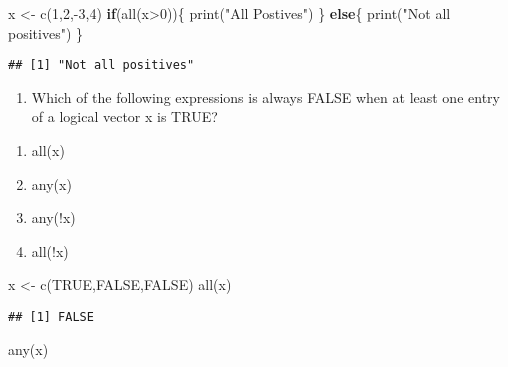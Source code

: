 \documentclass[
]{article}
\newenvironment{Shaded}{\begin{snugshade}}{\end{snugshade}}
\newcommand{\ConstantTok}[1]{\textcolor[rgb]{0.00,0.00,0.00}{#1}}
\newcommand{\ControlFlowTok}[1]{\textcolor[rgb]{0.13,0.29,0.53}{\textbf{#1}}}
\newcommand{\DecValTok}[1]{\textcolor[rgb]{0.00,0.00,0.81}{#1}}
\newcommand{\FunctionTok}[1]{\textcolor[rgb]{0.00,0.00,0.00}{#1}}
\newcommand{\NormalTok}[1]{#1}
\newcommand{\OtherTok}[1]{\textcolor[rgb]{0.56,0.35,0.01}{#1}}
\newcommand{\SpecialCharTok}[1]{\textcolor[rgb]{0.00,0.00,0.00}{#1}}
\newcommand{\StringTok}[1]{\textcolor[rgb]{0.31,0.60,0.02}{#1}}
\providecommand{\tightlist}{%
  \setlength{\itemsep}{0pt}\setlength{\parskip}{0pt}}
\begin{document}
\begin{Shaded}
\begin{Highlighting}[]
\NormalTok{x }\OtherTok{\textless{}{-}} \FunctionTok{c}\NormalTok{(}\DecValTok{1}\NormalTok{,}\DecValTok{2}\NormalTok{,}\SpecialCharTok{{-}}\DecValTok{3}\NormalTok{,}\DecValTok{4}\NormalTok{)}
\ControlFlowTok{if}\NormalTok{(}\FunctionTok{all}\NormalTok{(x}\SpecialCharTok{\textgreater{}}\DecValTok{0}\NormalTok{))\{}
  \FunctionTok{print}\NormalTok{(}\StringTok{"All Postives"}\NormalTok{)}
\NormalTok{\} }\ControlFlowTok{else}\NormalTok{\{}
  \FunctionTok{print}\NormalTok{(}\StringTok{"Not all positives"}\NormalTok{)}
\NormalTok{\}}
\end{Highlighting}
\end{Shaded}

\begin{verbatim}
## [1] "Not all positives"
\end{verbatim}

\begin{enumerate}
\def\labelenumi{\arabic{enumi}.}
\setcounter{enumi}{1}
\tightlist
\item
  Which of the following expressions is always FALSE when at least one
  entry of a logical vector x is TRUE?
\end{enumerate}

\begin{enumerate}
\def\labelenumi{\alph{enumi}.}
\tightlist
\item
  all(x)
\item
  any(x)
\item
  any(!x)
\item
  all(!x)
\end{enumerate}

\begin{Shaded}
\begin{Highlighting}[]
\NormalTok{x }\OtherTok{\textless{}{-}} \FunctionTok{c}\NormalTok{(}\ConstantTok{TRUE}\NormalTok{,}\ConstantTok{FALSE}\NormalTok{,}\ConstantTok{FALSE}\NormalTok{)}
\FunctionTok{all}\NormalTok{(x)}
\end{Highlighting}
\end{Shaded}

\begin{verbatim}
## [1] FALSE
\end{verbatim}

\begin{Shaded}
\begin{Highlighting}[]
\FunctionTok{any}\NormalTok{(x)}
\end{Highlighting}
\end{Shaded}
\end{document}
